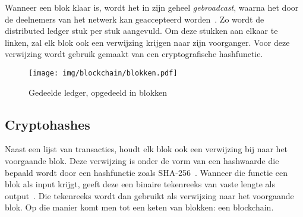 Wanneer een blok klaar is, wordt het in zijn geheel \textit{gebroadcast}, waarna het door de deelnemers van het netwerk kan geaccepteerd worden~\autocite{Nakamoto2008}. Zo wordt de distributed ledger stuk per stuk aangevuld.
Om deze stukken aan elkaar te linken, zal elk blok ook een verwijzing krijgen naar zijn voorganger. Voor deze verwijzing wordt gebruik gemaakt van een cryptografische hashfunctie. 

\begin{figure}[H]
	\centering
	\texttt{[image: img/blockchain/blokken.pdf]}
	\caption{\label{fig:blokken}Gedeelde ledger, opgedeeld in blokken}
\end{figure}

\subsection{Cryptohashes}
\label{sub:cryptohashes}

Naast een lijst van transacties, houdt elk blok ook een verwijzing bij naar het voorgaande blok. Deze verwijzing is onder de vorm van een hashwaarde die bepaald wordt door een hashfunctie zoals SHA-256~\autocite{Nakamoto2008}. Wanneer die functie een blok als input krijgt, geeft deze een binaire tekenreeks van vaste lengte als output~\autocite{Slaats2019}. Die tekenreeks wordt dan gebruikt als verwijzing naar het voorgaande blok. Op die manier komt men tot een keten van blokken: een blockchain.

\begin{center}
\end{center}

